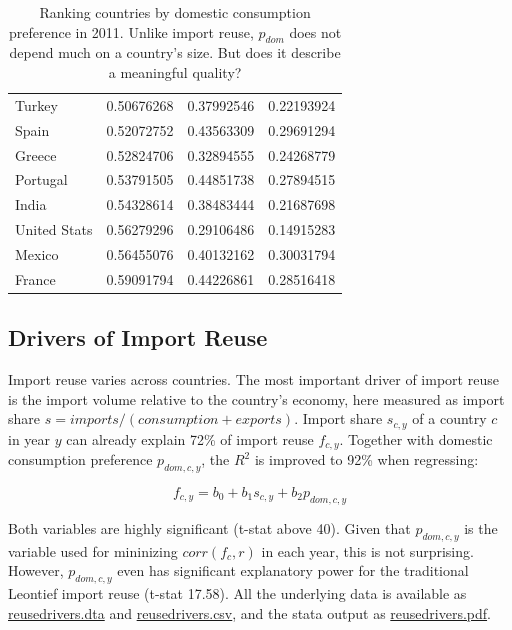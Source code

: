 \documentclass[english]{uzhpub}
\renewcommand{\baselinestretch}{1.5}
\begin{document}
\begin{table}[]
\begin{tabular}{llll}
Turkey                                                     & 0.50676268 & 0.37992546            & 0.22193924     \\
Spain                                                      & 0.52072752 & 0.43563309            & 0.29691294     \\
Greece                                                     & 0.52824706 & 0.32894555            & 0.24268779     \\
Portugal                                                   & 0.53791505 & 0.44851738            & 0.27894515     \\
India                                                      & 0.54328614 & 0.38483444            & 0.21687698     \\
United Stats                                               & 0.56279296 & 0.29106486            & 0.14915283     \\
Mexico                                                     & 0.56455076 & 0.40132162            & 0.30031794     \\
France                                                     & 0.59091794 & 0.44226861            & 0.28516418    
\end{tabular}
\caption{Ranking countries by domestic consumption preference in 2011. Unlike import reuse, $p_{dom}$ does not depend much on a country's size. But does it describe a meaningful quality?} \label{tab:ranking}
\end{table}

\renewcommand{\baselinestretch}{1.5}

\subsection{Drivers of Import Reuse}
Import reuse varies across countries. The most important driver of import reuse is the import volume relative to the country's economy, here measured as import share $s = imports / (consumption + exports)$. Import share $s_{c,y}$ of a country $c$ in year $y$ can already explain 72\% of import reuse $f_{c,y}$. Together with domestic consumption preference $p_{dom,c,y}$, the $R^2$ is improved to 92\% when regressing:

\[f_{c,y} = b_0 + b_1 s_{c,y} + b_2 p_{dom,c,y}\]

Both variables are highly significant (t-stat above 40). Given that $p_{dom,c,y}$ is the variable used for mininizing $corr(f_c, r)$ in each year, this is not surprising. However, $p_{dom,c,y}$ even has significant explanatory power for the traditional Leontief import reuse (t-stat 17.58). All the underlying data is available as \href{https://github.com/meisserecon/importreuse/blob/master/data/reusedrivers.dta}{reusedrivers.dta} and \href{https://github.com/meisserecon/importreuse/blob/master/data/reusedrivers.dta}{reusedrivers.csv}, and the stata output as \href{https://github.com/meisserecon/importreuse/blob/master/data/reusedrivers.pdf}{reusedrivers.pdf}.
\end{document}
